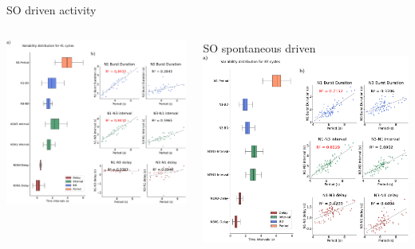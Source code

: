 \documentclass[aspectratio=43]{beamer}
\begin{document}
\begin{frame}{SO driven activity}
{\begin{columns}
\begin{column}{0.5\textwidth}
			\includegraphics[width=\textwidth]{invariants/data/SUSSEX/SO_driven/images/panel_with_intervals_boxplot_invariants.pdf}
		\end{column}
		\begin{column}{0.5\textwidth}
			\centering SO spontaneous driven
			\includegraphics[width=\textwidth]{invariants/data/SUSSEX/prep4_so_driven_2/images/panel_with_intervals_boxplot_invariants.pdf}
		\end{column}
	\end{columns}
}	

\end{frame}
\end{document}
